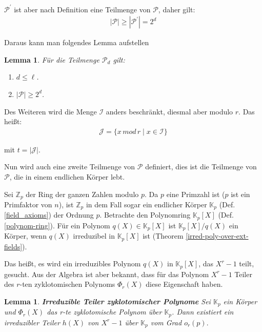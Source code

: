 \documentclass[12pt,oneside]{article}
\newtheorem{lemma}[theorem]{Lemma}
\theoremstyle{remark}
\theoremstyle{definition}
\begin{document}
\begin{flushleft}
$\mathcal{P}^{'}$ ist aber nach Definition eine Teilmenge von $\mathcal{P}$, daher gilt:
\begin{align*}
    |\mathcal{P}| \geq |\mathcal{P}^{'}| = 2^d
\end{align*}

Daraus kann man folgendes Lemma aufstellen

\begin{lemma}\label{lemma-cond-3.5}
Für die Teilmenge $\mathcal{P}_d$ gilt:
\begin{enumerate}
    \item $d \leq \ell$.\newline
    
    \item $|\mathcal{P}| \geq 2^d$.
    
\end{enumerate}
\end{lemma}

Des Weiteren wird die Menge $\mathcal{I}$ anders beschränkt, diesmal aber modulo $r$. Das heißt:
\begin{align*}
    \mathcal{J} = \{ x \, mod \, r \mid x \in \mathcal{I} \}
\end{align*}

mit $t = |\mathcal{J}|$.

Nun wird auch eine zweite Teilmenge von $\mathcal{P}$ definiert, dies ist die Teilmenge von $\mathcal{P}$, die in einem endlichen Körper lebt.

Sei $\mathbb{Z}_p$ der Ring der ganzen Zahlen modulo $p$. Da $p$ eine Primzahl ist ($p$ ist ein Primfaktor von $n$), ist $\mathbb{Z}_p$ in dem Fall sogar ein endlicher Körper $\mathbb{K}_p$ (Def. \ref{field_axioms}) der Ordnung $p$. Betrachte den Polynomring $\mathbb{K}_p[X]$ (Def. \ref{polynom-ring}). Für ein Polynom $q(X) \in \mathbb{K}_p[X]$ ist $\mathbb{K}_p[X]/q(X)$ ein Körper, wenn $q(X)$ irreduzibel in $\mathbb{K}_p[X]$ ist (Theorem \ref{irred-poly-over-ext-fields}).

Das heißt, es wird  ein irreduzibles Polynom $q(X)$ in $\mathbb{K}_p[X]$, das $X^r - 1$ teilt, gesucht. Aus der Algebra ist aber bekannt, dass für das Polynom $X^r - 1$ Teiler des $r$-ten zyklotomischen Polynoms $\Phi_{r}(X)$ diese Eigenschaft haben.

\begin{lemma}\label{cyc_ov_fields}
\textbf{Irreduzible Teiler zyklotomischer Polynome}\newline
Sei $\mathbb{K}_{p}$ ein Körper und $\Phi_{r}(X)$ das r-te zyklotomische Polynom über $\mathbb{K}_{p}$. Dann existiert ein irreduzibler Teiler $h(X)$ von $X^r - 1$ über $\mathbb{K}_{p}$ vom Grad $o_{r}(p).$
\end{lemma}


\end{flushleft}
\end{document}
